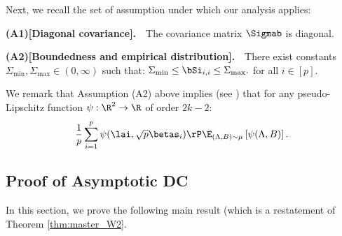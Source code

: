 Next, we recall the set of assumption under which our analysis applies:



%
\textbf{(A1)[Diagonal covariance].}~~The covariance matrix $\Sigmab$ is diagonal.

%
\textbf{(A2)[Boundedness and empirical distribution].}~~There exist constants $\Sigma_{\min},\Sigma_{\max}\in(0,\infty)$ such that:
$
\Sigma_{\min}\leq\bSi_{i,i}\leq \Sigma_{\max}.
$
for all $i\in[p].$ 


We remark that Assumption (A2) above implies (see \cite[Lem.~5]{bayati2011dynamics}) that for any pseudo-Lipschitz function $\psi:\R^2\rightarrow\R$ of order $2k-2$:
$$
\frac{1}{p}\sum_{i=1}^p\psi(\lai,\sqrt{p}\betas_i) \rP \E_{(\Lambda,B)\sim\mu}\left[ \psi(\Lambda,B)\right].
$$




\subsection{Proof of Asymptotic DC}
In this section, we prove the following main result (which is a restatement of Theorem \ref{thm:master_W2}.

